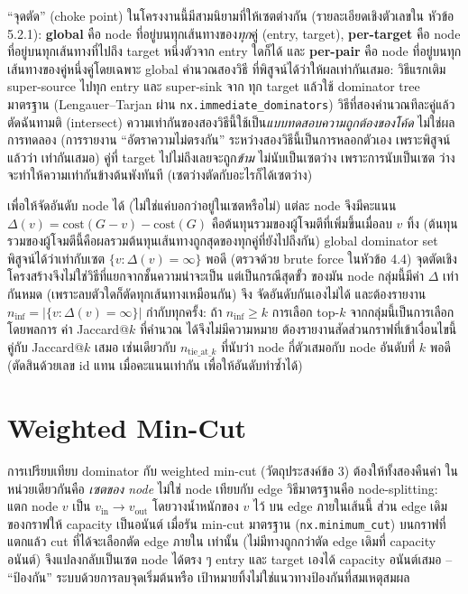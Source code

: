 ``จุดตัด'' (choke point) ในโครงงานนี้มีสามนิยามที่ให้เซตต่างกัน (รายละเอียดเชิงตัวเลขใน
หัวข้อ 5.2.1): \textbf{global} คือ node ที่อยู่บนทุกเส้นทางของ\emph{ทุก}คู่ (entry, target),
\textbf{per-target} คือ node ที่อยู่บนทุกเส้นทางที่ไปถึง target หนึ่งตัวจาก entry ใดก็ได้ และ
\textbf{per-pair} คือ node ที่อยู่บนทุกเส้นทางของคู่หนึ่งคู่โดยเฉพาะ global คำนวณสองวิธี
ที่พิสูจน์ได้ว่าให้ผลเท่ากันเสมอ: วิธีแรกเติม super-source ไปทุก entry และ super-sink จาก
ทุก target แล้วใช้ dominator tree มาตรฐาน (Lengauer--Tarjan ผ่าน
\texttt{nx.immediate\_dominators}) วิธีที่สองคำนวณทีละคู่แล้วตัดฉันทามติ (intersect)
ความเท่ากันของสองวิธีนี้ใช้เป็น\emph{แบบทดสอบความถูกต้องของโค้ด} ไม่ใช่ผลการทดลอง
(การรายงาน ``อัตราความไม่ตรงกัน'' ระหว่างสองวิธีนี้เป็นการหลอกตัวเอง เพราะพิสูจน์แล้วว่า
เท่ากันเสมอ) คู่ที่ target ไปไม่ถึงเลยจะถูก\emph{ข้าม} ไม่นับเป็นเซตว่าง เพราะการนับเป็นเซต
ว่างจะทำให้ความเท่ากันข้างต้นพังทันที (เซตว่างตัดกับอะไรก็ได้เซตว่าง)

เพื่อให้จัดอันดับ node ได้ (ไม่ใช่แค่บอกว่าอยู่ในเซตหรือไม่) แต่ละ node จึงมีคะแนน
$\Delta(v) = \text{cost}(G{-}v) - \text{cost}(G)$ คือต้นทุนรวมของผู้โจมตีที่เพิ่มขึ้นเมื่อลบ $v$
ทิ้ง (ต้นทุนรวมของผู้โจมตีนี้คือผลรวมต้นทุนเส้นทางถูกสุดของทุกคู่ที่ยังไปถึงกัน) global
dominator set พิสูจน์ได้ว่าเท่ากับเซต $\{v : \Delta(v) = \infty\}$ พอดี (ตรวจด้วย brute force
ในหัวข้อ 4.4) จุดตัดเชิงโครงสร้างจึงไม่ใช่วิธีที่แยกจากชั้นความน่าจะเป็น แต่เป็นกรณีสุดขั้ว
ของมัน node กลุ่มนี้มีค่า $\Delta$ เท่ากันหมด (เพราะลบตัวใดก็ตัดทุกเส้นทางเหมือนกัน) จึง
จัดอันดับกันเองไม่ได้ และต้องรายงาน $n_{\inf} = |\{v : \Delta(v)=\infty\}|$ กำกับทุกครั้ง: ถ้า
$n_{\inf} \geq k$ การเลือก top-$k$ จากกลุ่มนี้เป็นการเลือกโดยพลการ ค่า Jaccard@$k$ ที่คำนวณ
ได้จึงไม่มีความหมาย ต้องรายงานสัดส่วนกราฟที่เข้าเงื่อนไขนี้คู่กับ Jaccard@$k$ เสมอ เช่นเดียวกับ
$n_{\text{tie\_at\_}k}$ ที่นับว่า node กี่ตัวเสมอกับ node อันดับที่ $k$ พอดี (ตัดสินด้วยเลข id แทน
เมื่อคะแนนเท่ากัน เพื่อให้อันดับทำซ้ำได้)

\section{Weighted Min-Cut}

การเปรียบเทียบ dominator กับ weighted min-cut (วัตถุประสงค์ข้อ 3) ต้องให้ทั้งสองคืนค่า
ในหน่วยเดียวกันคือ \emph{เซตของ node} ไม่ใช่ node เทียบกับ edge วิธีมาตรฐานคือ
node-splitting: แตก node $v$ เป็น $v_{\text{in}} \to v_{\text{out}}$ โดยวางน้ำหนักของ $v$ ไว้
บน edge ภายในเส้นนี้ ส่วน edge เดิมของกราฟให้ capacity เป็นอนันต์ เมื่อรัน min-cut
มาตรฐาน (\texttt{nx.minimum\_cut}) บนกราฟที่แตกแล้ว cut ที่ได้จะเลือกตัด edge ภายใน
เท่านั้น (ไม่มีทางถูกกว่าตัด edge เดิมที่ capacity อนันต์) จึงแปลงกลับเป็นเซต node ได้ตรง ๆ
entry และ target เองได้ capacity อนันต์เสมอ -- ``ป้องกัน'' ระบบด้วยการลบจุดเริ่มต้นหรือ
เป้าหมายทิ้งไม่ใช่แนวทางป้องกันที่สมเหตุสมผล

